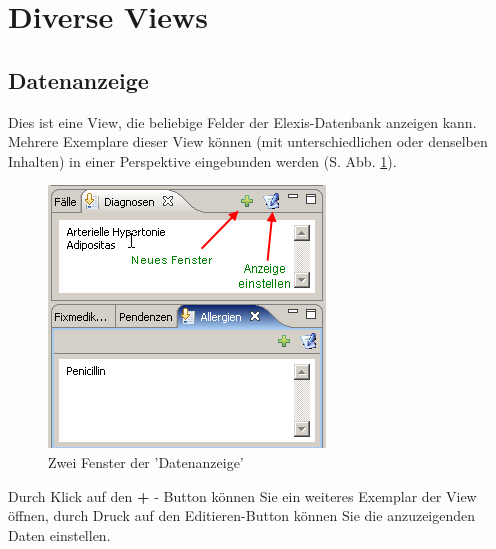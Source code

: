 
\section{Diverse Views}

\subsection{Datenanzeige}
Dies ist eine View, die beliebige Felder der Elexis-Datenbank anzeigen
kann. Mehrere Exemplare dieser View können (mit unterschiedlichen oder denselben
Inhalten) in einer Perspektive eingebunden werden (S. Abb. \ref{figure1}).
\begin{figure}[hb]
\includegraphics{images/data1}
\caption{Zwei Fenster der 'Datenanzeige'}
\label {figure1}
\end{figure}
Durch Klick auf den \textbf{+} - Button können Sie ein weiteres Exemplar der
View öffnen, durch Druck auf den Editieren-Button können Sie die anzuzeigenden
Daten einstellen.

